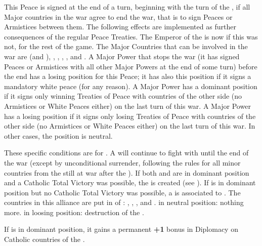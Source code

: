 \begin{digressions}
  \aparag This Peace is signed at the end of a turn, beginning with the turn
  of the , if all Major countries in the war
  agree to end the war, that is to sign Peaces or Armistices between them. The
  following effects are implemented as further consequences of the regular
  Peace Treaties.
  \aparag The Emperor of the \HRE is now \HAB if this was not, for the rest of
  the game.
  \aparag The Major Countries that can be involved in the war are \SPA (and
  \AUSmin), \AUS, \FRA, \HOL, \SUE, \ENG and \POL.
  \bparag A Major Power that stops the war (it has signed Peaces or Armistices
  with all other Major Powers at the end of some turn) before the end has a
  losing position for this Peace; it has also this position if it signs a
  mandatory white peace (for any reason).
  \bparag A Major Power has a dominant position if it signs only winning
  Treaties of Peace with countries of the other side (no Armistices or White
  Peaces either) on the last turn of this war.
  \bparag A Major Power has a losing position if it signs only losing Treaties
  of Peace with countries of the other side (no Armistices or White Peaces
  either) on the last turn of this war.
  \bparag In other cases, the position is neutral.

  \bparag These specific conditions are for \MAJHAB.
  \bparag A \AUSmin will continue to fight with \SPA until the end of the war
  (except by unconditional surrender, following the rules for all minor
  countries from the \HRE still at war after the ).
  \bparag If both \HIS and \AUS are in dominant position and a Catholic Total
  Victory was possible, the  is created (see
  ).
  \bparag If \HAB is in dominant position but no Catholic Total Victory was
  possible, a  is associated to \HAB.
  The countries in this alliance are put in \EG of \HAB: \paysBaviere,
  \paysTreves, \paysAlsace, \paysBade and \paysWurtemberg.
  \bparag \HAB in neutral position: nothing more.
  \bparag \HAB in loosing position: destruction of the
  .

  \aparag[Spain] If \SPA is in dominant position, it gains a permanent {\bf
    +1} bonus in Diplomacy on Catholic countries of the \HRE.



\end{digressions}
